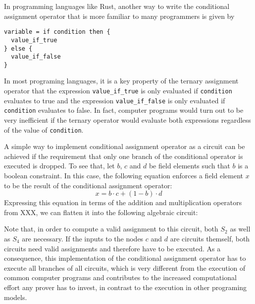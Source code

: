 In programming languages like Rust, another way to write the conditional assignment operator that is more familiar to many programmers is given by 
\begin{lstlisting}
variable = if condition then { 
  value_if_true 
} else { 
  value_if_false 
} 
\end{lstlisting}
In most programing languages, it is a key property of the ternary assignment operator that the expression \texttt{value\_if\_true} is only evaluated if \texttt{condition} evaluates to true and the expression \texttt{value\_if\_false} is only evaluated if \texttt{condition} evaluates to false. In fact, computer programs would turn out to be very inefficient if the ternary operator would evaluate both expressions regardless of the value of \texttt{condition}.

A simple way to implement conditional assignment operator as a circuit can be achieved if the requirement that only one branch of the conditional operator is executed is dropped. To see that, let $b$, $c$ and $d$ be field elements such that $b$ is a boolean constraint. In this case, the following equation enforces a field element $x$ to be the result of the conditional assignment operator: 
\begin{equation}
x = b\cdot c + (1-b)\cdot d
\end{equation}
Expressing this equation in terms of the addition and multiplication operators from XXX, we can flatten it into the following algebraic circuit:
\begin{center}
\end{center}
Note that, in order to compute a valid assignment to this circuit, both $S_2$ as well as $S_4$ are necessary. If the inputs to the nodes $c$ and $d$ are circuits themself, both circuits need valid assignments and therefore have to be executed. As a consequence, this implementation of the conditional assignment operator has to execute all branches of all circuits, which is very different from the execution of common computer programs and contributes to the increased computational effort any prover has to invest, in contrast to the execution in other programing models. 

